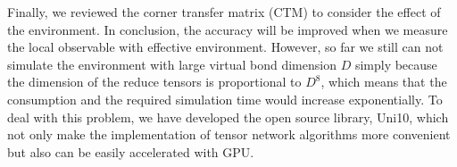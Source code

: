 Finally, we reviewed the corner transfer matrix (CTM) to consider the effect of the environment. In conclusion, the accuracy will be improved when we measure the local observable with effective environment. However, so far we still can not simulate the environment with large virtual bond dimension $D$ simply because the dimension of the reduce tensors is proportional to $D^8$, which means that the consumption and the required simulation time would increase exponentially. To deal with this problem, we have developed the open source library, Uni10, which not only make the implementation of tensor network algorithms more convenient but also can be easily accelerated with GPU.

